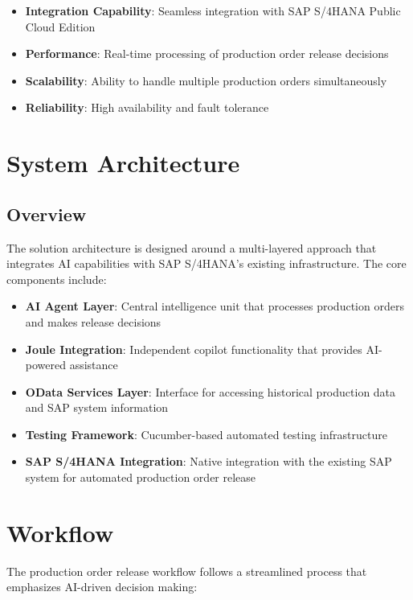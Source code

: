 \begin{itemize}
    \item \textbf{Integration Capability}: Seamless integration with SAP S/4HANA Public Cloud Edition
    \item \textbf{Performance}: Real-time processing of production order release decisions
    \item \textbf{Scalability}: Ability to handle multiple production orders simultaneously
    \item \textbf{Reliability}: High availability and fault tolerance
\end{itemize}

\section{System Architecture}

\subsection{Overview}

The solution architecture is designed around a multi-layered approach that integrates AI capabilities with SAP S/4HANA's existing infrastructure. The core components include:

\begin{itemize}
    \item \textbf{AI Agent Layer}: Central intelligence unit that processes production orders and makes release decisions
    \item \textbf{Joule Integration}: Independent copilot functionality that provides AI-powered assistance
    \item \textbf{OData Services Layer}: Interface for accessing historical production data and SAP system information
    \item \textbf{Testing Framework}: Cucumber-based automated testing infrastructure
    \item \textbf{SAP S/4HANA Integration}: Native integration with the existing SAP system for automated production order release
\end{itemize}


\section{Workflow}

The production order release workflow follows a streamlined process that emphasizes AI-driven decision making:

